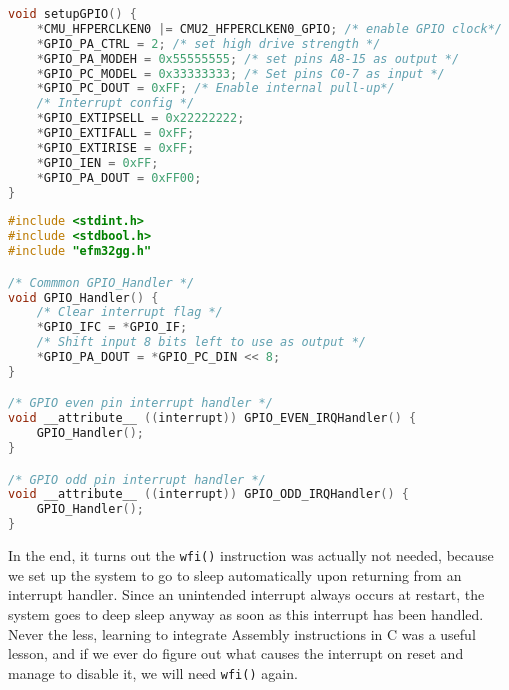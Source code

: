 \begin{minipage}{\linewidth}
\begin{lstlisting}[language=C, label=EX1-C-gpio, caption=gpio.c]
void setupGPIO() { 
    *CMU_HFPERCLKEN0 |= CMU2_HFPERCLKEN0_GPIO; /* enable GPIO clock*/
    *GPIO_PA_CTRL = 2; /* set high drive strength */
    *GPIO_PA_MODEH = 0x55555555; /* set pins A8-15 as output */
    *GPIO_PC_MODEL = 0x33333333; /* Set pins C0-7 as input */
    *GPIO_PC_DOUT = 0xFF; /* Enable internal pull-up*/
    /* Interrupt config */
    *GPIO_EXTIPSELL = 0x22222222;
    *GPIO_EXTIFALL = 0xFF;
    *GPIO_EXTIRISE = 0xFF;
    *GPIO_IEN = 0xFF;
    *GPIO_PA_DOUT = 0xFF00;
}
\end{lstlisting}
\end{minipage}

\begin{minipage}{\linewidth}
\begin{lstlisting}[language=C, label=EX1-C-interrupt-handler, caption=interrupt\_handlers.c]
#include <stdint.h>
#include <stdbool.h>
#include "efm32gg.h"

/* Commmon GPIO_Handler */
void GPIO_Handler() {
    /* Clear interrupt flag */
    *GPIO_IFC = *GPIO_IF;
    /* Shift input 8 bits left to use as output */
    *GPIO_PA_DOUT = *GPIO_PC_DIN << 8;
}

/* GPIO even pin interrupt handler */
void __attribute__ ((interrupt)) GPIO_EVEN_IRQHandler() {
    GPIO_Handler();
}

/* GPIO odd pin interrupt handler */
void __attribute__ ((interrupt)) GPIO_ODD_IRQHandler() {
    GPIO_Handler();
}
\end{lstlisting}
\end{minipage}

In the end, it turns out the \texttt{wfi()} instruction was actually not needed, because we set up the system to go to sleep automatically upon returning from an interrupt handler. Since an unintended interrupt always occurs at restart, the system goes to deep sleep anyway as soon as this interrupt has been handled. Never the less, learning to integrate Assembly instructions in C was a useful lesson, and if we ever do figure out what causes the interrupt on reset and manage to disable it, we will need \texttt{wfi()} again.
